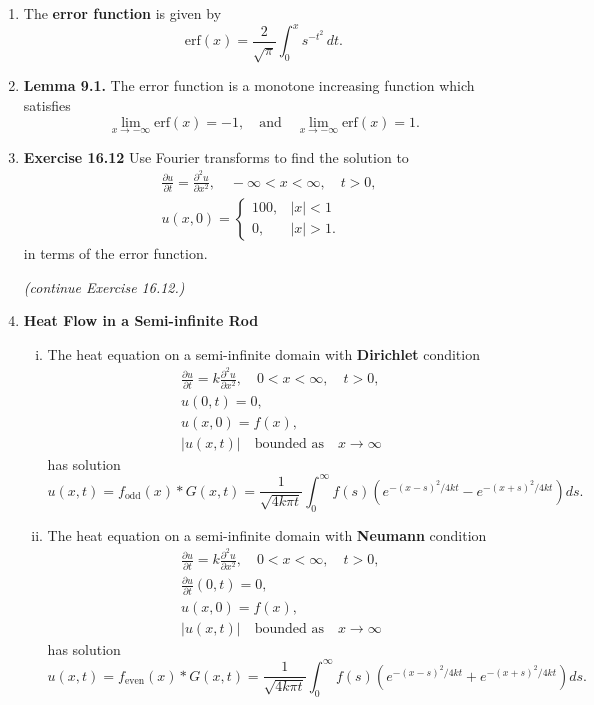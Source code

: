 \begin{enumerate}
\item The \textbf{error function} is given by
\[\text{erf}(x)=\frac{2}{\sqrt{\pi}} \int_{0}^{x}s^{-t^{2}}\, dt. \]


\item \textbf{Lemma 9.1.} The error function is a monotone increasing function which satisfies
\[\lim_{x\to -\infty} \text{erf}(x)=-1,\quad \text{and}\quad \lim_{x\to -\infty} \text{erf}(x)=1.\]




\item \textbf{Exercise 16.12}
Use Fourier transforms to find the solution to
\begin{align*}
    & \frac{\partial u}{\partial t}= \frac{\partial ^{2} u}{\partial x^{2}}, \quad -\infty<x<\infty, \quad t>0,\\
    & u(x,0)=\begin{cases}
               100, & |x|<1 \\
               0, & |x|>1.
             \end{cases}
\end{align*}
in terms of the error function.

\newpage \textit{(continue Exercise 16.12.)}

\newpage

\item \textbf{Heat Flow in a Semi-infinite Rod} 

\begin{enumerate}[(i)]
 \item  The heat equation on a semi-infinite domain with \textbf{Dirichlet} condition
\begin{align*}
    & \frac{\partial u}{\partial t}=k \frac{\partial ^{2} u}{\partial x^{2}}, \quad 0<x<\infty, \quad t>0,\\
    & u(0,t) = 0, \\
    & u(x,0)=f(x), \\
    & |u(x,t)| \quad \text{bounded as} \quad x\to \infty
\end{align*}
has solution
\[u(x,t) = f_{\text{odd}}(x)*G(x,t) = \frac{1}{\sqrt{4k\pi t}}\int_{0}^{\infty} f(s) \left( e^{-(x-s)^{2}/4kt} - e^{-(x+s)^{2}/4kt} \right) ds. \]


\item The heat equation on a semi-infinite domain with \textbf{Neumann} condition
\begin{align*}
    & \frac{\partial u}{\partial t}=k \frac{\partial ^{2} u}{\partial x^{2}}, \quad 0<x<\infty, \quad t>0,\\
    & \frac{\partial u}{\partial t}(0,t) = 0, \\
    & u(x,0)=f(x), \\
    & |u(x,t)| \quad \text{bounded as} \quad x\to  \infty
\end{align*}
has solution
\[u(x,t) = f_{\text{even}}(x)*G(x,t) = \frac{1}{\sqrt{4k\pi t}}\int_{0}^{\infty} f(s) \left( e^{-(x-s)^{2}/4kt} + e^{-(x+s)^{2}/4kt} \right) ds. \]

\end{enumerate}




\end{enumerate}




